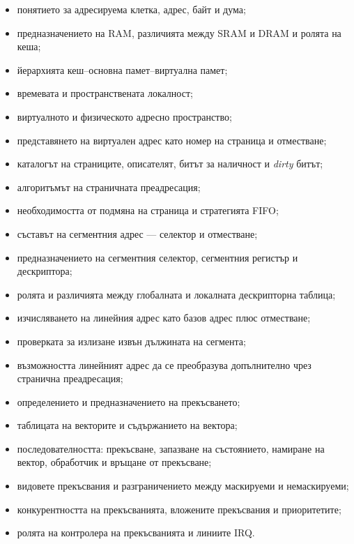 \begin{itemize}
    \item понятието за адресируема клетка, адрес, байт и дума;
    \item предназначението на RAM, различията между SRAM и DRAM и ролята на кеша;
    \item йерархията кеш--основна памет--виртуална памет;
    \item времевата и пространствената локалност;
    \item виртуалното и физическото адресно пространство;
    \item представянето на виртуален адрес като номер на страница и отместване;
    \item каталогът на страниците, описателят, битът за наличност и \emph{dirty} битът;
    \item алгоритъмът на страничната преадресация;
    \item необходимостта от подмяна на страница и стратегията FIFO;
    \item съставът на сегментния адрес --- селектор и отместване;
    \item предназначението на сегментния селектор, сегментния регистър и дескриптора;
    \item ролята и различията между глобалната и локалната дескрипторна таблица;
    \item изчисляването на линейния адрес като базов адрес плюс отместване;
    \item проверката за излизане извън дължината на сегмента;
    \item възможността линейният адрес да се преобразува допълнително чрез странична преадресация;
    \item определението и предназначението на прекъсването;
    \item таблицата на векторите и съдържанието на вектора;
    \item последователността: прекъсване, запазване на състоянието, намиране на вектор, обработчик и връщане от прекъсване;
    \item видовете прекъсвания и разграничението между маскируеми и немаскируеми;
    \item конкурентността на прекъсванията, вложените прекъсвания и приоритетите;
    \item ролята на контролера на прекъсванията и линиите IRQ.
\end{itemize}
